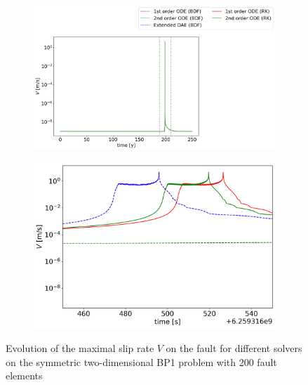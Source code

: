 \begin{figure}[H]
    \centering
    \begin{subfigure}[b]{0.45\textwidth}
     	\centering
    	\includegraphics[width=1.45\textwidth]{images/TANDEMtimeEvolution_2D_maxSlipRate_allFormulations.png}
    \end{subfigure} 
    \begin{subfigure}[b]{0.45\textwidth}
    	\centering
    	\includegraphics[width=1\textwidth]{images/TANDEMtimeEvolution_2D_maxSlipRate_allFormulations_Earthquake.png}
    \end{subfigure}
    \caption{Evolution of the maximal slip rate $V$ on the fault for different solvers on the symmetric two-dimensional BP1 problem with 200 fault elements}
    \label{fig:timeEvolutionTANDEM_V}
\end{figure}


